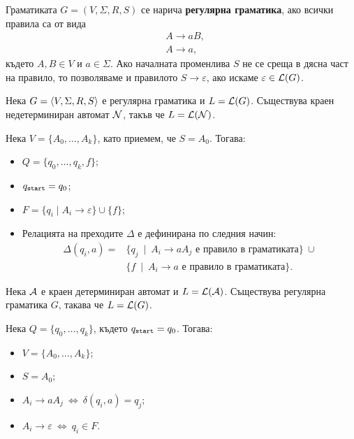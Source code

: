 Граматиката $G = (V, \Sigma, R, S)$ се нарича {\bf регулярна граматика},
ако всички правила са от вида 
\begin{align*}
  & A \to aB,\\
  & A \to a,
\end{align*}
където $A, B \in V$ и $a \in \Sigma$.
Ако началната променлива $S$ не се среща в дясна част на правило, то позволяваме и правилото $S \to \varepsilon$,
ако искаме $\varepsilon \in \mathcal{L}(G)$.

\begin{proposition}
  Нека $G = \langle{V,\Sigma,R,S}\rangle$ е регулярна граматика и $L = \mathcal{L}(G)$.
  Съществува краен недетерминиран автомат $\mathcal{N}$, такъв че $L = \mathcal{L}(\mathcal{N})$.
\end{proposition}
\begin{hint}
  Нека $V = \{A_0,\dots,A_k\}$, като приемем, че $S = A_0$. Тогава:
  \begin{itemize}
  \item
    $Q = \{q_0,\dots,q_k,f\}$;
  \item
    $q_{\texttt{start}} = q_0$;
  \item
    $F = \{q_i \mid A_i \to \varepsilon\} \cup \{f\}$;
  \item
    Релацията на преходите $\Delta$ е дефинирана по следния начин:
    \begin{align*}
      \Delta(q_i,a) = & \{ q_j\ \mid\ A_i \to aA_j \text{ е правило в граматиката}\}\ \cup\\
                      & \{ f\ \mid\ A_i \to a \text{ е правило в граматиката}\}.
    \end{align*}
  \end{itemize}
\end{hint}

\begin{proposition}
  Нека $\mathcal{A}$ е краен детерминиран автомат и $L = \mathcal{L}(\mathcal{A})$.
  Съществува регулярна граматика $G$, такава че $L = \mathcal{L}(G)$.
\end{proposition}
\begin{hint}
  Нека $Q = \{q_0,\dots,q_k\}$, където $q_{\texttt{start}} = q_0$. Тогава:
  \begin{itemize}
  \item 
    $V = \{A_0,\dots,A_k\}$;
  \item
    $S = A_0$;
  \item
    $A_i \to aA_j\ \iff\ \delta(q_i,a) = q_j$;
  \item
    $A_{i} \to \varepsilon\ \iff\ q_{i} \in F$.
  \end{itemize}
\end{hint}


